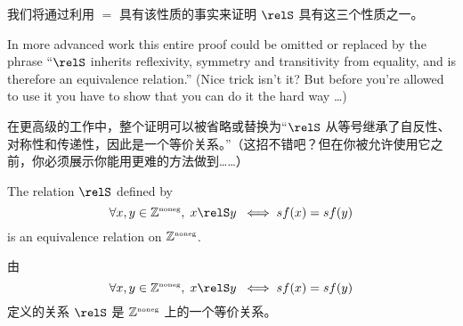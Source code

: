 我们将通过利用 $=$ 具有该性质的事实来证明 $\relS$ 具有这三个性质之一。

In more advanced
work this entire proof could be omitted or replaced by the phrase ``$\relS$ inherits
reflexivity, symmetry and transitivity from equality, and is therefore an equivalence
relation.''  (Nice trick isn't it?  But before you're allowed to use it you have
to show that you can do it the hard way \ldots)

在更高级的工作中，整个证明可以被省略或替换为“$\relS$ 从等号继承了自反性、对称性和传递性，因此是一个等价关系。”（这招不错吧？但在你被允许使用它之前，你必须展示你能用更难的方法做到……）

\begin{thm} 
The relation $\relS$ defined by
\[ \forall x, y \in \Naturals, \;
x \relS y \; \iff sf(x) = sf(y) \]
\noindent is an equivalence relation on ${\mathbb Z}^{\mbox{\tiny noneg}}$.
\end{thm}

\begin{thm} 
由
\[ \forall x, y \in \Naturals, \;
x \relS y \; \iff sf(x) = sf(y) \]
\noindent 定义的关系 $\relS$ 是 ${\mathbb Z}^{\mbox{\tiny noneg}}$ 上的一个等价关系。
\end{thm}

